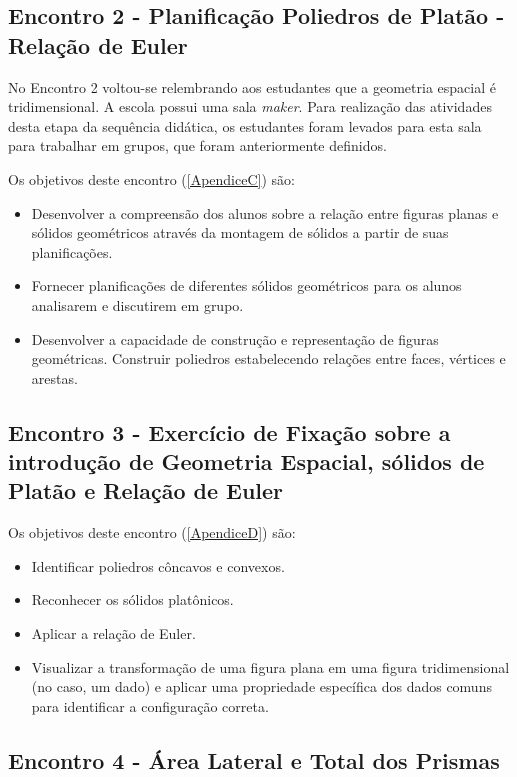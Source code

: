 \subsection{Encontro 2 - Planificação Poliedros de Platão - Relação de Euler}

No Encontro 2 voltou-se relembrando aos estudantes que a geometria espacial é tridimensional.  A escola possui uma sala \textit{maker}. Para realização das atividades desta etapa da sequência didática, os estudantes foram levados para esta sala para trabalhar em grupos, que foram anteriormente definidos.

Os objetivos deste encontro (\autoref{ApendiceC}) são:

\begin{itemize}
    \item Desenvolver a compreensão dos alunos sobre a relação entre figuras planas e sólidos geométricos através da montagem de sólidos a partir de suas planificações.
    \item Fornecer planificações de diferentes sólidos geométricos para os alunos analisarem e discutirem em grupo.
    \item Desenvolver a capacidade de construção e representação de figuras geométricas. Construir poliedros estabelecendo relações entre faces, vértices e arestas.
\end{itemize}

\subsection{Encontro 3 - Exercício de Fixação sobre a introdução de Geometria Espacial, sólidos de Platão e Relação de Euler}

Os objetivos deste encontro (\autoref{ApendiceD}) são:

\begin{itemize}
    \item Identificar poliedros côncavos e convexos.
    \item Reconhecer os sólidos platônicos.
    \item Aplicar a relação de Euler.
    \item Visualizar a transformação de uma figura plana em uma figura tridimensional (no caso, um dado) e aplicar uma propriedade específica dos dados comuns para identificar a configuração correta.
\end{itemize}

\subsection{Encontro 4 - Área Lateral e Total dos Prismas}

